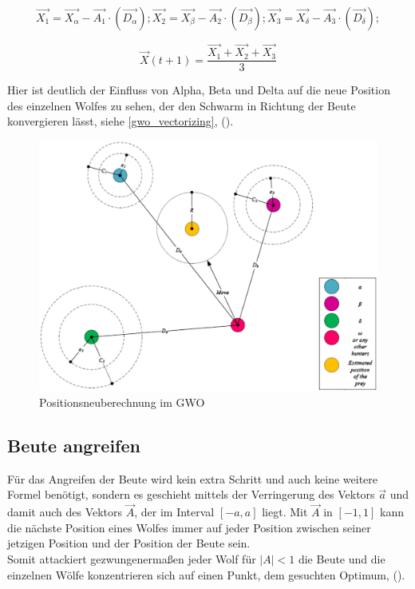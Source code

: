 \begin{equation}
    \vec{X_1} = \vec{X_\alpha} - \vec{A_1} \cdot (\vec{D_\alpha});
    \vec{X_2} = \vec{X_\beta} - \vec{A_2} \cdot (\vec{D_\beta});
    \vec{X_3} = \vec{X_\delta} - \vec{A_3} \cdot (\vec{D_\delta});
    \label{calcX_123}
\end{equation}

\begin{equation}
    \vec{X}(t+1) = \frac{\vec{X_1} + \vec{X_2} + \vec{X_3}}{3}
    \label{calcNextP2}
\end{equation}

Hier ist deutlich der Einfluss von Alpha, Beta und Delta auf die neue Position des einzelnen Wolfes zu sehen, der den Schwarm in Richtung der Beute konvergieren lässt, siehe \autoref{gwo_vectorizing}, (\cite[vgl. Mirjalili 2014, S.7]{MIRJALILI201446}).

\begin{figure}[ht]
    \begin{center}
        \includegraphics[width=1.0\textwidth]{assets/img/tgis12517-fig-0002-m.png}
        \caption[Positionsneuberechnung im GWO]{Positionsneuberechnung im GWO \cite{MIRJALILI201446}}
        \label{gwo_vectorizing}
    \end{center}
\end{figure}

\subsection{Beute angreifen}
Für das Angreifen der Beute wird kein extra Schritt und auch keine weitere Formel benötigt, sondern es geschieht mittels der Verringerung des Vektors $\vec{a}$ und damit auch des Vektors $\vec{A}$, der im Interval $[-a, a]$ liegt. Mit $\vec{A}$ in $[-1, 1]$ kann die nächste Position eines Wolfes immer auf jeder Position zwischen seiner jetzigen Position und der Position der Beute sein. \\
Somit attackiert gezwungenermaßen jeder Wolf für $|A| < 1$ die Beute und die einzelnen Wölfe konzentrieren sich auf einen Punkt, dem gesuchten Optimum, (\cite[vgl. Mirjalili 2014, S.8]{MIRJALILI201446}). 
